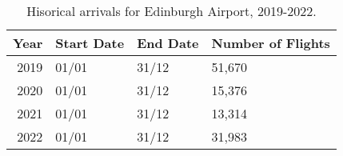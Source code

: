 \begin{table}[ht]
\centering
\begin{tabular}{rlll}
  \hline
{\textbf{Year}} & {\textbf{Start Date}} & {\textbf{End Date}} & {\textbf{Number of Flights}} \\ 
  \hline
2019 & 01/01 & 31/12 & 51,670 \\ 
  2020 & 01/01 & 31/12 & 15,376 \\ 
  2021 & 01/01 & 31/12 & 13,314 \\ 
  2022 & 01/01 & 31/12 & 31,983 \\ 
   \hline
\end{tabular}
\caption{Hisorical arrivals for Edinburgh Airport, 2019-2022. \label{tab:observed_schedule}} 
\end{table}
